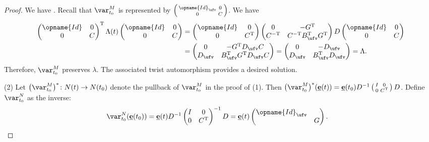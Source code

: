 \documentclass[pdftex]{sigma}
\newcommand{\Id}{{\opname{Id}}}
\newcommand{\ee}{\mathbf{e}}
\newcommand{\uee}{\underline{\ee}}
\numberwithin{equation}{section}
\begin{document}
\begin{proof}
We have . Recall that $\var_{t_{0}}^{M}$ is represented by $\left(\begin{smallmatrix}
\Id_{\ufv} & 0\\
0 & C
\end{smallmatrix}\right)$. We have
\begin{align*}
\begin{pmatrix}
\Id & 0\\
0 & C
\end{pmatrix}^{\rm T}\Lambda(t)\begin{pmatrix}
\Id & 0\\
0 & C
\end{pmatrix} & =\begin{pmatrix}
\Id & 0\\
0 & C^{\rm T}
\end{pmatrix}\begin{pmatrix}
0 & -G^{\rm T}\\
C^{\rm -T} & C^{\rm -T}B_{\ufv}^{\rm T}G^{\rm T}
\end{pmatrix}D\begin{pmatrix}
\Id & 0\\
0 & C
\end{pmatrix}\\
 & =\begin{pmatrix}
0 & -G^{\rm T}D_{\ufv}C\\
D_{\ufv} & B_{\ufv}^{\rm T}G^{\rm T}D_{\ufv}C
\end{pmatrix} =\begin{pmatrix}
0 & -D_{\ufv}\\
D_{\ufv} & B_{\ufv}^{\rm T}D_{\ufv}
\end{pmatrix} =\Lambda.
\end{align*}
Therefore, $\var_{t_{0}}^{M}$ preserves $\lambda$. The associated
twist automorphism provides a desired solution.

(2) Let $\bigl(\var_{t_{0}}^{M}\bigr)^{*}\colon N(t)\rightarrow N(t_{0})$ denote
the pullback of $\var_{t_{0}}^{M}$ in the proof of (1). Then $\bigl(\var_{t_{0}}^{M}\bigr)^{*}(\uee(t))=\uee(t_{0})D^{-1}\left(\begin{smallmatrix}
I & 0\\
0 & C^{\rm T}
\end{smallmatrix}\right)D$. Define $\var_{t_{0}}^{N}$ as the inverse:
\begin{align*}
\var_{t_{0}}^{N}(\uee(t_{0})) & =\uee(t)D^{-1}\begin{pmatrix}
I & 0\\
0 & C^{\rm T}
\end{pmatrix}^{-1}D =\uee(t)\begin{pmatrix}
\Id_{\ufv}\\
 & G
\end{pmatrix}.
\end{align*}


\end{proof}
\end{document}
